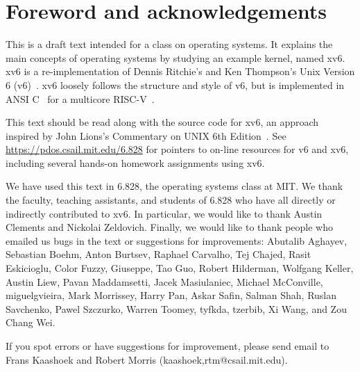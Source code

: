 \chapter*{Foreword and acknowledgements}


This is a draft text intended for a class on operating systems. It
explains the main concepts of operating systems by studying an example
kernel, named xv6.  xv6 is a re-implementation of Dennis Ritchie's and
Ken Thompson's Unix Version 6 (v6)~\cite{unix}.  xv6 loosely follows the structure
and style of v6, but is implemented in ANSI C~\cite{kernighan} for 
a multicore RISC-V~\cite{riscv}.

This text should be read along with the source code for xv6, an approach 
inspired by John Lions's Commentary on UNIX 6th Edition~\cite{lions}. See
\url{https://pdos.csail.mit.edu/6.828} for pointers to on-line
resources for v6 and xv6, including several hands-on homework assignments
using xv6.

We have used this text in 6.828, the operating systems class at MIT.
We thank the faculty, teaching assistants, and students of 6.828 who
have all directly or indirectly contributed to xv6.  In particular, we
would like to thank Austin Clements and Nickolai Zeldovich.  Finally,
we would like to thank people who emailed us bugs in the text or
suggestions for improvements: Abutalib Aghayev, Sebastian Boehm, Anton
Burtsev, Raphael Carvalho, Tej Chajed, Rasit Eskicioglu, Color Fuzzy, Giuseppe,
Tao Guo, Robert Hilderman, Wolfgang Keller, Austin Liew, Pavan
Maddamsetti, Jacek Masiulaniec, Michael McConville, miguelgvieira,
Mark Morrissey, Harry Pan, Askar Safin, Salman Shah, Ruslan Savchenko,
Pawel Szczurko, Warren Toomey, tyfkda, tzerbib, Xi Wang, and Zou Chang Wei.

If you spot errors or have suggestions for improvement, please send email to
Frans Kaashoek and Robert Morris (kaashoek,rtm@csail.mit.edu).
